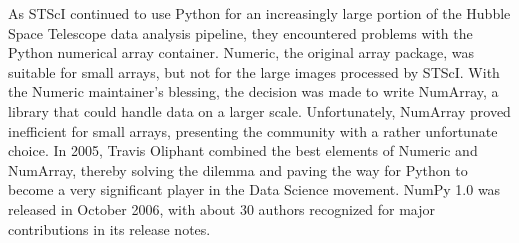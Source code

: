 \documentclass[fleqn,10pt]{wlscirep}
\begin{document}




As STScI continued to use Python for an increasingly large portion
of the Hubble Space Telescope data analysis pipeline, they encountered
problems with the Python numerical array container.
Numeric, the original array package, was
suitable for small arrays, but not for the large images processed by
STScI.  With the Numeric maintainer's blessing, the decision was made
to write NumArray, a library that could handle data on a larger
scale.  Unfortunately, NumArray proved inefficient for small arrays,
presenting the community with a rather unfortunate choice.  In 2005,
Travis Oliphant combined the best elements of Numeric and NumArray,
thereby solving the dilemma and paving the way for Python to become
a very significant player in the Data Science movement. NumPy
1.0 was released in October 2006\cite{numpy-1.0-tag}, with about 30
authors recognized for major contributions in its release notes.

\end{document}
